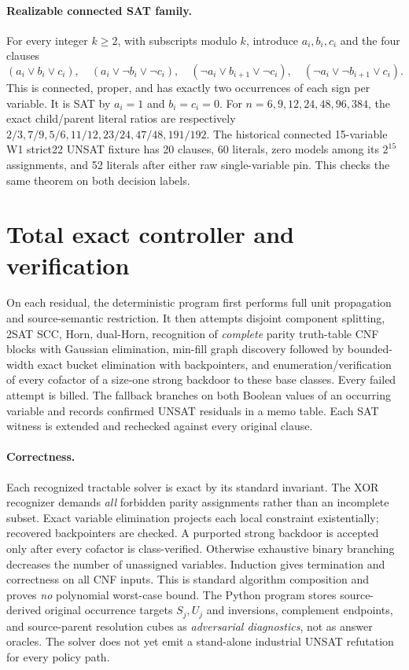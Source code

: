 \documentclass[11pt]{article}
\begin{document}
\paragraph{Realizable connected SAT family.}
For every integer $k\ge2$, with subscripts modulo $k$, introduce
$a_i,b_i,c_i$ and the four clauses
\[
(a_i\vee b_i\vee c_i),\quad
(a_i\vee\neg b_i\vee\neg c_i),\quad
(\neg a_i\vee b_{i+1}\vee\neg c_i),\quad
(\neg a_i\vee\neg b_{i+1}\vee c_i).
\]
This is connected, proper, and has exactly two occurrences of each
sign per variable. It is SAT by $a_i=1$ and $b_i=c_i=0$.
For $n=6,9,12,24,48,96,384$, the exact child/parent literal ratios
are respectively $2/3,7/9,5/6,11/12,23/24,47/48,191/192$.
The historical connected 15-variable W1 strict22 UNSAT fixture
has 20 clauses, 60 literals, zero models among its $2^{15}$
assignments, and 52 literals after either raw single-variable pin.
This checks the same theorem on both decision labels.

\section{Total exact controller and verification}
On each residual, the deterministic program first performs full unit
propagation and source-semantic restriction. It then attempts disjoint
component splitting, 2SAT SCC, Horn, dual-Horn, recognition of
\emph{complete} parity truth-table CNF blocks with Gaussian elimination,
min-fill graph discovery followed by bounded-width exact bucket
elimination with backpointers, and enumeration/verification of every
cofactor of a size-one strong backdoor to these base classes. Every failed
attempt is billed. The fallback branches on both Boolean values of an
occurring variable and records confirmed UNSAT residuals in a memo table.
Each SAT witness is extended and rechecked against every original clause.

\paragraph{Correctness.} Each recognized tractable solver is exact by
its standard invariant. The XOR recognizer demands \emph{all} forbidden
parity assignments rather than an incomplete subset. Exact variable
elimination projects each local constraint existentially; recovered
backpointers are checked. A purported strong backdoor is accepted only
after every cofactor is class-verified. Otherwise exhaustive binary
branching decreases the number of unassigned variables. Induction
gives termination and correctness on all CNF inputs. This is standard
algorithm composition and proves \emph{no} polynomial worst-case bound.
The Python program stores source-derived original occurrence targets
$S_j,U_j$ and inversions, complement endpoints, and source-parent
resolution cubes as \emph{adversarial diagnostics}, not as answer oracles.
The solver does not yet emit a stand-alone industrial UNSAT refutation
for every policy path.
\end{document}
